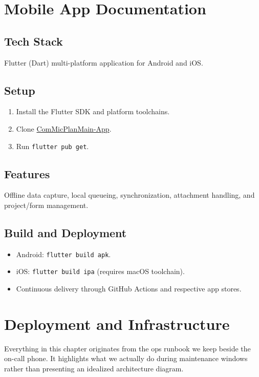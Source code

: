 \documentclass[11pt]{article}
\begin{document}
\section{Mobile App Documentation}
\subsection{Tech Stack}
Flutter (Dart) multi-platform application for Android and iOS.

\subsection{Setup}
\begin{enumerate}[leftmargin=*]
  \item Install the Flutter SDK and platform toolchains.
  \item Clone \href{https://github.com/groupmappers/ComMicPlanMain-App}{ComMicPlanMain-App}.
  \item Run \verb|flutter pub get|.
\end{enumerate}

\subsection{Features}
Offline data capture, local queueing, synchronization, attachment handling, and project/form management.

\subsection{Build and Deployment}
\begin{itemize}[leftmargin=*]
  \item Android: \verb|flutter build apk|.
  \item iOS: \verb|flutter build ipa| (requires macOS toolchain).
  \item Continuous delivery through GitHub Actions and respective app stores.
\end{itemize}

\section{Deployment and Infrastructure}
\noindent Everything in this chapter originates from the ops runbook we keep beside the on-call phone. It highlights what we actually do during maintenance windows rather than presenting an idealized architecture diagram.
\end{document}
